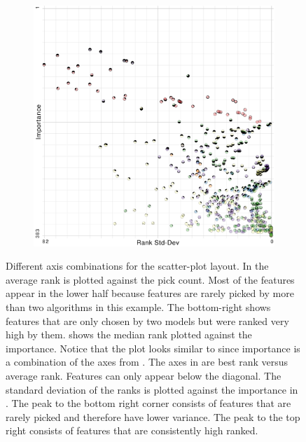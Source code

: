 \begin{figure}[t]
\begin{subfigure}{0.24\linewidth}
\label{subfig:ba}
\end{subfigure}%
~%
\begin{subfigure}{0.24\linewidth}
\includegraphics[width=\linewidth]{infuse/si}
\label{subfig:si}
\end{subfigure}
\caption[Different axis combinations for the scatter-plot layout.]{
Different axis combinations for the scatter-plot layout.
In  the average rank is plotted against the pick count.
Most of the features appear in the lower half because features are rarely picked by more than two algorithms in this example.  The bottom-right shows features that are only chosen
by two models but were ranked very high by them.
 shows the median rank plotted against the importance.
Notice that the plot looks similar to  since importance
is a combination of the axes from .
The axes in  are best rank versus average rank.
Features can only appear below the diagonal.
The standard deviation of the ranks is plotted against the importance
in .
The peak to the bottom right corner consists of features that are rarely
picked and therefore have lower variance.
The peak to the top right consists of features that
are consistently high ranked.
}
\label{fig:scatter}
\end{figure}

